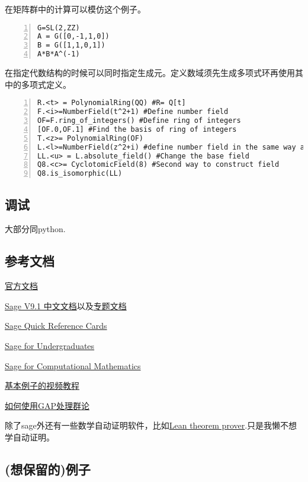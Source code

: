 \documentclass[11pt]{amsart}
\begin{document}
在矩阵群中的计算可以模仿这个例子。
\begin{lstlisting}[numbers=left,numberstyle=\tiny,numbersep=10pt]
G=SL(2,ZZ)
A = G([0,-1,1,0])
B = G([1,1,0,1])
A*B*A^(-1)
\end{lstlisting}

在指定代数结构的时候可以同时指定生成元。定义数域须先生成多项式环再使用其中的多项式定义。
\begin{lstlisting}[numbers=left,numberstyle=\tiny,numbersep=10pt]
R.<t> = PolynomialRing(QQ) #R= Q[t]
F.<i>=NumberField(t^2+1) #Define number field
OF=F.ring_of_integers() #Define ring of integers
[OF.0,OF.1] #Find the basis of ring of integers
T.<z>= PolynomialRing(OF)
L.<l>=NumberField(z^2+i) #define number field in the same way again
LL.<u> = L.absolute_field() #Change the base field
Q8.<c>= CyclotomicField(8) #Second way to construct field
Q8.is_isomorphic(LL)
\end{lstlisting}

\subsection{调试}
大部分同python.

\subsection{参考文档}
\href{https://doc.sagemath.org/}{官方文档}

\href{https://www.osgeo.cn/sagemath/index.html}{Sage V9.1 中文文档}以及\href{https://www.osgeo.cn/sagemath/thematic_tutorials/}{专题文档}

\href{https://wiki.sagemath.org/quickref}{Sage Quick Reference Cards}

\href{http://gregorybard.com/Sage.html}{Sage for Undergraduates}

\href{http://dl.lateralis.org/public/sagebook/sagebook-ba6596d.pdf}{Sage for Computational
Mathematics}

\href{https://www.youtube.com/watch?v=A4j3qbCn1PM&list=PLYpVTXjEi1odEHr_-4fkbudq-gQnljSso&index=3}{基本例子的视频教程}

\href{http://www.math.hawaii.edu/~williamdemeo/GAP/GapNotes.pdf}{如何使用GAP处理群论}

除了sage外还有一些数学自动证明软件，比如\href{https://leanprover-community.github.io/}{Lean theorem prover}.只是我懒不想学自动证明。
\subsection{(想保留的)例子}
\end{document}
